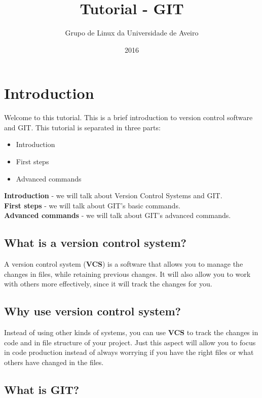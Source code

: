 \documentclass{article}
\title{Tutorial - GIT}
\author{Grupo de Linux da Universidade de Aveiro}
\date{2016}
\begin{document}
\maketitle

\section{Introduction}

Welcome to this tutorial. This is a brief introduction to version control software and GIT. This tutorial is separated in three parts:

\begin{itemize}
\item{Introduction}
\item{First steps}
\item{Advanced commands}
\end{itemize}

\textbf{Introduction} - we will talk about Version Control Systems and GIT.\\
\textbf{First steps} - we will talk about GIT's basic commands.\\
\textbf{Advanced commands} - we will talk about GIT's advanced commands.\\

\subsection{What is a version control system?}

A version control system (\textbf{VCS}) is a software that allows you to manage the changes in files, while retaining previous changes. It will also allow you to work with others more effectively, since it will track the changes for you.

\subsection{Why use version control system?}

Instead of using other kinds of systems, you can use \textbf{VCS} to track the changes in code and in file structure of your project. Just this aspect will allow you to focus in code production instead of always worrying if you have the right files or what others have changed in the files.

\subsection{What is GIT?}
\end{document}
